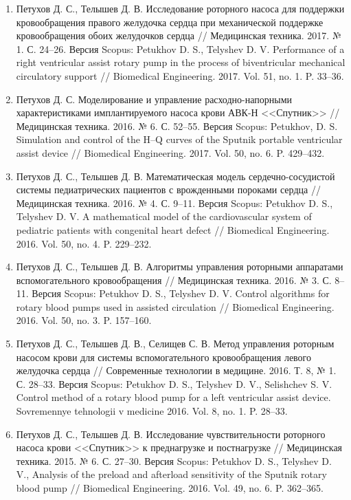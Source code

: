 \begin{enumerate}[leftmargin=25pt, itemsep=12pt] %
  \item Петухов Д. С., Телышев Д. В. Исследование роторного насоса для поддержки кровообращения правого желудочка сердца при механической поддержке кровообращения обоих желудочков сердца // Медицинская техника. 2017. № 1. С. 24--26. Версия Scopus: \textcolor{bib3}{Petukhov D. S., Telyshev D. V. Performance of a right ventricular assist rotary pump in the process of biventricular mechanical circulatory support // Biomedical Engineering. 2017. Vol. 51, no. 1. P. 33--36.}
  \item Петухов Д. С. Моделирование и управление расходно-напорными характеристиками имплантируемого насоса крови АВК-Н <<Спутник>> // Медицинская техника. 2016. № 6. С. 52--55. Версия Scopus: \textcolor{bib3}{Petukhov, D. S. Simulation and control of the H--Q curves of the Sputnik portable ventricular assist device // Biomedical Engineering. 2017. Vol. 50, no. 6. P. 429--432.}
  \item Петухов Д. С., Телышев Д. В. Математическая модель сердечно-сосудистой системы педиатрических пациентов с врожденными пороками сердца // Медицинская техника. 2016. № 4. С. 9--11. Версия Scopus: \textcolor{bib3}{Petukhov D. S., Telyshev D. V. A mathematical model of the cardiovascular system of pediatric patients with congenital heart defect // Biomedical Engineering. 2016. Vol. 50, no. 4. P. 229--232.}
  \item Петухов Д. С., Телышев Д. В. Алгоритмы управления роторными аппаратами вспомогательного кровообращения // Медицинская техника. 2016. № 3. С. 8--11. Версия Scopus: \textcolor{bib3}{Petukhov D. S., Telyshev D. V. Control algorithms for rotary blood pumps used in assisted circulation // Biomedical Engineering. 2016. Vol. 50, no. 3. P. 157--160.}
  \item Петухов Д. С., Телышев Д. В., Селищев С. В. Метод управления роторным насосом крови для системы вспомогательного кровообращения левого желудочка сердца // Современные технологии в медицине. 2016. Т. 8, № 1. С. 28--33. Версия Scopus: \textcolor{bib3}{Petukhov D. S., Telyshev D. V., Selishchev S. V. Control method of a rotary blood pump for a left ventricular assist device. Sovremennye tehnologii v medicine 2016. Vol. 8, no. 1. P. 28--33.}
  \item Петухов Д. С., Телышев Д. В. Исследование чувствительности роторного насоса крови <<Спутник>> к преднагрузке и постнагрузке // Медицинская техника. 2015. № 6. С. 27--30. Версия Scopus: \textcolor{bib3}{Petukhov D. S., Telyshev D. V., Analysis of the preload and afterload sensitivity of the Sputnik rotary blood pump // Biomedical Engineering. 2016. Vol. 49, no. 6. P. 362--365.}

\end{enumerate}
